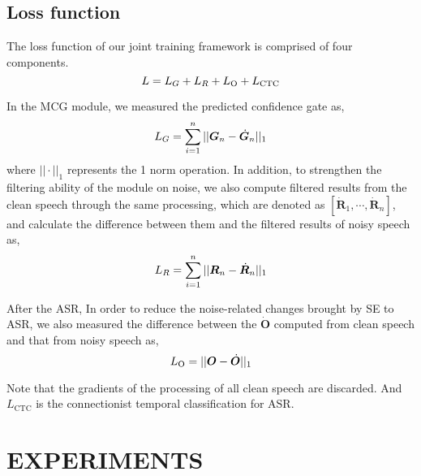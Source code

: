 \documentclass{article}
\begin{document}
		
	\subsection{Loss function}
	The loss function of our joint training framework is comprised of four components. 
	\begin{equation}
		\setlength{\abovedisplayskip}{3pt}
		\setlength{\belowdisplayskip}{3pt}
		L =  L_G + L_R + L_\text{O} + L_\text{CTC}
	\end{equation}
	
	In the MCG module, we measured the predicted confidence gate as,
	\begin{equation}
		\setlength{\abovedisplayskip}{3pt}
		\setlength{\belowdisplayskip}{3pt}
		L_G = \sum_{i=1}^{n}||\bm{G}_n-\dot{\bm{G}}_n||_1
	\end{equation}
	where $||\cdot||_1$ represents the 1 norm operation. In addition, to strengthen the filtering ability of the module on noise, we also compute filtered results from the clean speech through the same processing, which are denoted as $\left[\dot{\bm{R}}_1,\cdots,\dot{\bm{R}}_n\right]$, and calculate the difference between them and the filtered results of noisy speech as,
	\begin{equation}
		\setlength{\abovedisplayskip}{3pt}
		\setlength{\belowdisplayskip}{3pt}
		L_R = \sum_{i=1}^{n}||\bm{R}_n-\dot{\bm{R}}_n||_1
	\end{equation}
	
	After the ASR, In order to reduce the noise-related changes brought by SE to ASR, we also measured the difference between the $\dot{\bm{O}}$ computed from clean speech and that from noisy speech as, 
	\begin{equation}
		\setlength{\abovedisplayskip}{3pt}
		\setlength{\belowdisplayskip}{3pt}
		L_\text{O} = ||\bm{O}-\dot{\bm{O}}||_1
	\end{equation}

	Note that the gradients of the processing of all clean speech are discarded. And $L_\text{CTC}$ is the connectionist temporal classification \cite{ctc} for ASR.
	
	\section{EXPERIMENTS}
\end{document}
